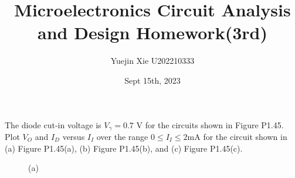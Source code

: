 \documentclass[a4paper,11pt,UTF8]{article}
\title{Microelectronics Circuit Analysis and Design Homework(3rd)}
\author{Yuejin Xie \quad U202210333}
\date{Sept 15th, 2023 }
\begin{document}
\maketitle
{} The diode cut-in voltage is $V_\gamma = 0.7$ V for the circuits shown in Figure
P1.45. Plot $V_O$ and $I_D$ versus $I_I$ over the range $0 \leq I_I \leq 2 $mA for the circuit
shown in (a) Figure P1.45(a), (b) Figure P1.45(b), and (c) Figure
P1.45(c).\\
\begin{figure}[H]
	\centering  %
	\caption{(a)}
\end{figure}
\end{document}
